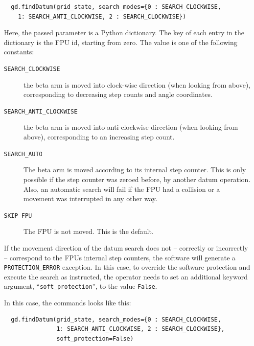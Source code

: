 \documentclass[11pt,a4paper]{scrartcl}
\begin{document}
\begin{verbatim}
  gd.findDatum(grid_state, search_modes={0 : SEARCH_CLOCKWISE,
    1: SEARCH_ANTI_CLOCKWISE, 2 : SEARCH_CLOCKWISE})
\end{verbatim}

Here, the passed parameter is a Python dictionary. The key of
each entry in the dictionary is the FPU id, starting from zero.
The value is one of the following constants:

\begin{description}
\item[\texttt{SEARCH\_CLOCKWISE}] the beta arm is moved into clock-wise
  direction (when looking from above), corresponding to decreasing step
  counts and angle coordinates.
  
\item[\texttt{SEARCH\_ANTI\_CLOCKWISE}] the beta arm is moved into
  anti-clockwise direction (when looking from above), corresponding to
  an increasing step count.
  
\item[\texttt{SEARCH\_AUTO}] The beta arm is moved according to its
  internal step counter. This is only possible if the step counter was
  zeroed before, by another datum operation. Also, an automatic search
  will fail if the FPU had a collision or a movement was interrupted
  in any other way.
  
\item[\texttt{SKIP\_FPU}] The FPU is not moved. This is the default.
  
\end{description}


If the movement direction of the datum search does not -- correctly or
incorrectly -- correspond to the FPUs internal step counters, the
software will generate a \texttt{PROTECTION\_ERROR} exception.  In
this case, to override the software protection and execute the search
as instructed, the operator needs to set an additional keyword
argument, ``\texttt{soft\_protection}'', to the value \texttt{False}.

In this case, the commands looks like this:

\begin{verbatim}
  gd.findDatum(grid_state, search_modes={0 : SEARCH_CLOCKWISE,
               1: SEARCH_ANTI_CLOCKWISE, 2 : SEARCH_CLOCKWISE},
               soft_protection=False)
\end{verbatim}
\end{document}

